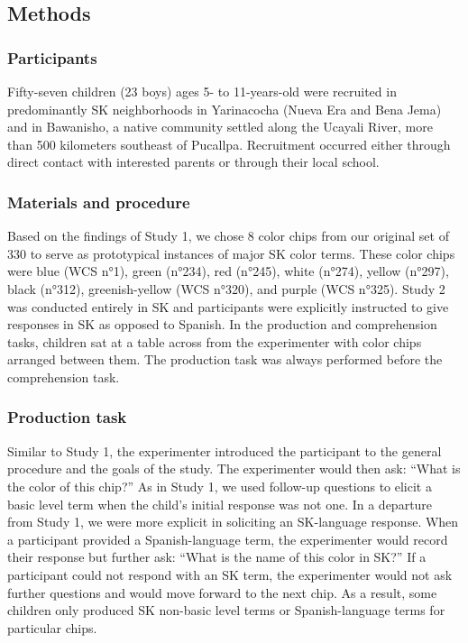 \documentclass[
  english,
  ,apa7,floatsintext]{apa6}
\begin{document}
\hypertarget{methods-1}{%
\subsection{Methods}\label{methods-1}}

\hypertarget{participants-1}{%
\subsubsection{Participants}\label{participants-1}}

Fifty-seven children (23 boys) ages 5- to 11-years-old were recruited in predominantly SK neighborhoods in Yarinacocha (Nueva Era and Bena Jema) and in Bawanisho, a native community settled along the Ucayali River, more than 500 kilometers southeast of Pucallpa. Recruitment occurred either through direct contact with interested parents or through their local school.

\hypertarget{materials-and-procedure-1}{%
\subsubsection{Materials and procedure}\label{materials-and-procedure-1}}

Based on the findings of Study 1, we chose 8 color chips from our original set of 330 to serve as prototypical instances of major SK color terms. These color chips were blue (WCS n°1), green (n°234), red (n°245), white (n°274), yellow (n°297), black (n°312), greenish-yellow (WCS n°320), and purple (WCS n°325). Study 2 was conducted entirely in SK and participants were explicitly instructed to give responses in SK as opposed to Spanish. In the production and comprehension tasks, children sat at a table across from the experimenter with color chips arranged between them. The production task was always performed before the comprehension task.

\hypertarget{production-task}{%
\subsubsection{Production task}\label{production-task}}

Similar to Study 1, the experimenter introduced the participant to the general procedure and the goals of the study. The experimenter would then ask: ``What is the color of this chip?'' As in Study 1, we used follow-up questions to elicit a basic level term when the child's initial response was not one. In a departure from Study 1, we were more explicit in soliciting an SK-language response. When a participant provided a Spanish-language term, the experimenter would record their response but further ask: ``What is the name of this color in SK?'' If a participant could not respond with an SK term, the experimenter would not ask further questions and would move forward to the next chip. As a result, some children only produced SK non-basic level terms or Spanish-language terms for particular chips.
\end{document}
